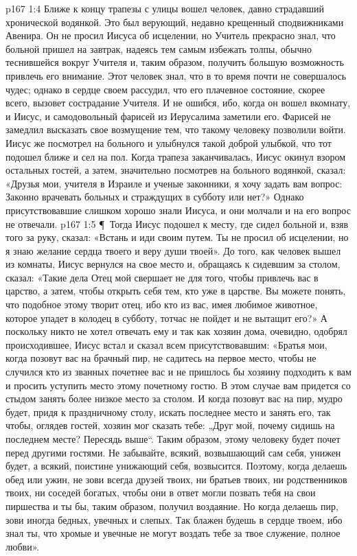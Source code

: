 \vs p167 1:4 Ближе к концу трапезы с улицы вошел человек, давно страдавший хронической водянкой. Это был верующий, недавно крещенный сподвижниками Авенира. Он не просил Иисуса об исцелении, но Учитель прекрасно знал, что больной пришел на завтрак, надеясь тем самым избежать толпы, обычно теснившейся вокруг Учителя и, таким образом, получить большую возможность привлечь его внимание. Этот человек знал, что в то время почти не совершалось чудес; однако в сердце своем рассудил, что его плачевное состояние, скорее всего, вызовет сострадание Учителя. И не ошибся, ибо, когда он вошел вкомнату, и Иисус, и самодовольный фарисей из Иерусалима заметили его. Фарисей не замедлил высказать свое возмущение тем, что такому человеку позволили войти. Иисус же посмотрел на больного и улыбнулся такой доброй улыбкой, что тот подошел ближе и сел на пол. Когда трапеза заканчивалась, Иисус окинул взором остальных гостей, а затем, значительно посмотрев на больного водянкой, сказал: «Друзья мои, учителя в Израиле и ученые законники, я хочу задать вам вопрос: Законно врачевать больных и страждущих в субботу или нет?» Однако присутствовавшие слишком хорошо знали Иисуса, и они молчали и на его вопрос не отвечали.
\vs p167 1:5 \P\ Тогда Иисус подошел к месту, где сидел больной и, взяв того за руку, сказал: «Встань и иди своим путем. Ты не просил об исцелении, но я знаю желание сердца твоего и веру души твоей». До того, как человек вышел из комнаты, Иисус вернулся на свое место и, обращаясь к сидевшим за столом, сказал: «Такие дела Отец мой свершает не для того, чтобы привлечь вас в царство, а затем, чтобы открыть себя тем, кто уже в царстве. Вы можете понять, что подобное этому творит отец, ибо кто из вас, имея любимое животное, которое упадет в колодец в субботу, тотчас не пойдет и не вытащит его?» А поскольку никто не хотел отвечать ему и так как хозяин дома, очевидно, одобрял происходившее, Иисус встал и сказал всем присутствовавшим: «Братья мои, когда позовут вас на брачный пир, не садитесь на первое место, чтобы не случился кто из званных почетнее вас и не пришлось бы хозяину подходить к вам и просить уступить место этому почетному гостю. В этом случае вам придется со стыдом занять более низкое место за столом. И когда позовут вас на пир, мудро будет, придя к праздничному столу, искать последнее место и занять его, так чтобы, оглядев гостей, хозяин мог сказать тебе: „Друг мой, почему сидишь на последнем месте? Пересядь выше“. Таким образом, этому человеку будет почет перед другими гостями. Не забывайте, всякий, возвышающий сам себя, унижен будет, а всякий, поистине унижающий себя, возвысится. Поэтому, когда делаешь обед или ужин, не зови всегда друзей твоих, ни братьев твоих, ни родственников твоих, ни соседей богатых, чтобы они в ответ могли позвать тебя на свои пиршества и ты бы, таким образом, получил воздаяние. Но когда делаешь пир, зови иногда бедных, увечных и слепых. Так блажен будешь в сердце твоем, ибо знал ты, что хромые и увечные не могут воздать тебе за твое служение, полное любви».
